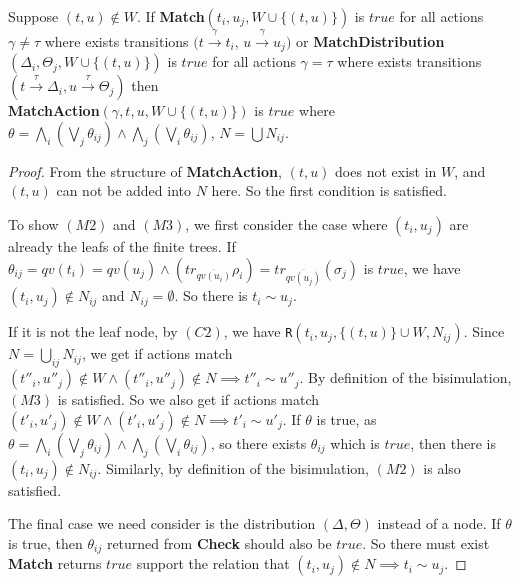 \documentclass[a4paper,UKenglish,cleveref, autoref]{lipics-v2019}
\begin{document}
\begin{proposition} Suppose $(t,u)\notin W$.
If \textbf{Match}$(t_i,u_j,W\cup\{(t,u)\})$ is $true$ for all actions $\gamma\neq\tau$ where exists transitions $(t\xrightarrow{\gamma}t_i$, $u\xrightarrow{\gamma}u_j)$ or \textbf{MatchDistribution}$(\Delta_i,\Theta_j,W\cup\{(t,u)\})$ is $true$ for all actions $\gamma=\tau$ where exists transitions $(t\xrightarrow{\tau}\Delta_i,u\xrightarrow{\tau}\Theta_j)$ then\\
\textbf{MatchAction}$(\gamma,t,u,W\cup\{(t,u)\})$ is $true$ where
$\theta=\bigwedge_i(\bigvee_j\theta_{ij})\wedge\bigwedge_j(\bigvee_i\theta_{ij})$, $N=\bigcup N_{ij}$.
\end{proposition}
\begin{proof}
From the structure of \textbf{MatchAction}, $(t,u)$ does not exist in $W$, and $(t,u)$ can not be added into $N$ here. So the first condition is satisfied.

To show $(M2)$ and $(M3)$, we first consider the case where $(t_i,u_j)$ are already the leafs of the finite trees. If $\theta_{ij}=qv(t_i)=qv(u_j)\wedge(tr_{\overline{qv(u_i)}}\rho_i)=tr_{\overline{qv(u_j)}}(\sigma_j)$ is $true$, we have $(t_i,u_j)\notin N_{ij}$ and $N_{ij}=\emptyset$. So there is $t_i\sim u_j$.

If it is not the leaf node, by $(C2)$, we have \texttt{R}$(t_i,u_j,\{(t,u)\}\cup W,N_{ij})$. Since  $N=\bigcup_{ij}N_{ij}$, we get if actions match $(t''_i,u''_j)\notin W\wedge(t''_i,u''_j)\notin N\implies t''_i\sim u''_j$. By definition of the bisimulation, $(M3)$ is satisfied. So we also get if actions match $(t'_i,u'_j)\notin W\wedge(t'_i,u'_j)\notin N\implies t'_i\sim u'_j$. If $\theta$ is true, as $\theta=\bigwedge_i(\bigvee_j\theta_{ij})\wedge\bigwedge_j(\bigvee_i\theta_{ij})$, so there exists $\theta_{ij}$ which is $true$, then there is $(t_i,u_j)\notin N_{ij}$. Similarly, by definition of the bisimulation, $(M2)$ is also satisfied.

The final case we need consider is the distribution $(\Delta,\Theta)$ instead of a node. If $\theta$ is true, then $\theta_{ij}$ returned from \textbf{Check} should also be $true$. So there must exist \textbf{Match} returns $true$ support the relation that $(t_i,u_j)\notin N\implies t_i\sim u_j$.
\end{proof}
\end{document}
